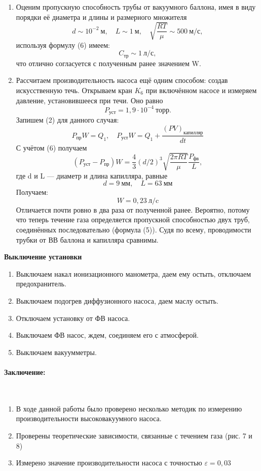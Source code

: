 \documentclass[a4paper, 12pt]{article}
\newcommand{\parag}[1]{\paragraph*{#1:}}
\begin{document}
\begin{enumerate}
	\item Оценим пропускную способность трубы от вакуумного баллона, имея в виду порядки её диаметра и длины и размерного множителя $$d \sim 10^{-2}~\text{м},\quad L \sim 1 ~\text{м},\quad \sqrt{\frac{RT}{\mu}} \sim 500 ~\text{м/с},$$ используя формулу (6) имеем:
	$$C_\text{тр} \sim 1 ~\text{л/с},$$
	что отлично согласуется с полученным ранее значением W.
	\item
	Рассчитаем производительность насоса ещё одним способом: создав искусственную течь. Открываем кран $K_6$ при включённом  насосе и измеряем давление, установившееся при течи. Оно равно $$P_\text{уст} = 1,9 \cdot 10^{-4} ~\text{торр}.$$
	Запишем (2) для данного случая:
		$$P_\text{пр}W = Q_1, \quad P_\text{уст}W = Q_1 + \frac{(PV)_\text{капилляр}}{dt}$$
	С учётом (6) получаем
	$$(P_\text{уст} - P_\text{пр})W = \frac{4}{3}(d/2)^3\sqrt{\frac{2\pi RT}{\mu}}\frac{P_\text{фв}}{L},$$
	где d и L --- диаметр и длина капилляра, равные
	$$d = 9 ~\text{мм},\quad L = 63 ~\text{мм}$$
	Получаем:
	$$W = 0,23 ~\text{л/c}$$
	Отличается почти ровно в два раза от полученной ранее. Вероятно, потому что теперь течение газа определяется пропускной способностью двух труб, соединённых последовательно (формула (5)). Судя по всему, проводимости трубки от ВВ баллона и капилляра сравнимы.
\end{enumerate}

\textbf{Выключение установки}
\begin{enumerate}
	\item Выключаем накал ионизационного манометра, даем ему остыть, отключаем предохранитель.
	\item Выключаем подогрев диффузионного насоса, даем маслу остыть.
	\item Отключаем установку от ФВ насоса.
	\item Выключаем ФВ насос, ждем, соединяем его с атмосферой.
	\item Выключаем вакуумметры.
\end{enumerate}

\parag {Заключение} ~\\
\begin{enumerate}
	\item В ходе данной работы было проверено несколько методик по измерению производительности высоковакуумного насоса.
	\item Проверены теоретические зависимости, связанные с течением газа (рис. 7 и 8)
	\item Измерено значение производительности насоса с точностью $\varepsilon = 0,03$
\end{enumerate}
\end{document}
